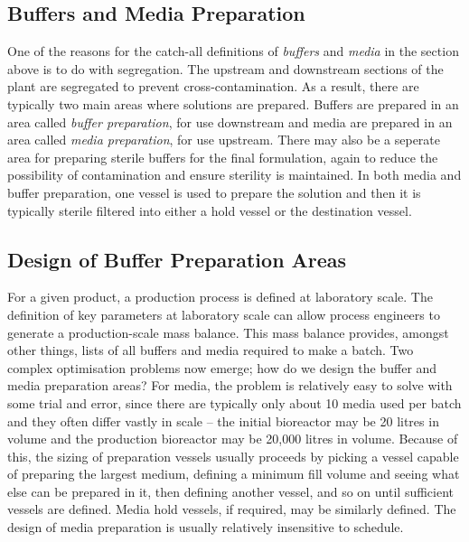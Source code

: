 \subsection{Buffers and Media Preparation}\label{SS.buffmedprep}

One of the reasons for the catch-all definitions of \emph{buffers} and
\emph{media} in the section above is to do with segregation.
The upstream and downstream sections of the plant are segregated to prevent
cross-contamination.
As a result, there are typically two main areas where solutions are prepared.
Buffers are prepared in an area called \emph{buffer preparation}, for use
downstream and media are prepared in an area called \emph{media preparation},
for use upstream.
There may also be a seperate area for preparing sterile buffers for the final
formulation, again to reduce the possibility of contamination and ensure
sterility is maintained.
In both media and buffer preparation, one vessel is used to prepare the solution
and then it is typically sterile filtered into either a hold vessel or the
destination vessel.

\subsection{Design of Buffer Preparation Areas}\label{SS.buffprepdes}

For a given product, a production process is defined at laboratory scale.  The
definition of key parameters at laboratory scale can allow process engineers to
generate a production-scale mass balance.  This mass balance provides, amongst
other things, lists of all buffers and media required to make a batch.  Two
complex optimisation problems now emerge; how do we design the buffer and media
preparation areas?  For media, the problem is relatively easy to solve with some
trial and error, since there are typically only about 10 media used per batch
and they often differ vastly in scale -- the initial bioreactor may be 20 litres
in volume and the production bioreactor may be 20,000 litres in volume.  Because
of this, the sizing of preparation vessels usually proceeds by picking a vessel
capable of preparing the largest medium, defining a minimum fill volume and
seeing what else can be prepared in it, then defining another vessel, and so on
until sufficient vessels are defined.  Media hold vessels, if required, may be 
similarly defined.  The design of media preparation is usually relatively
insensitive to schedule.

